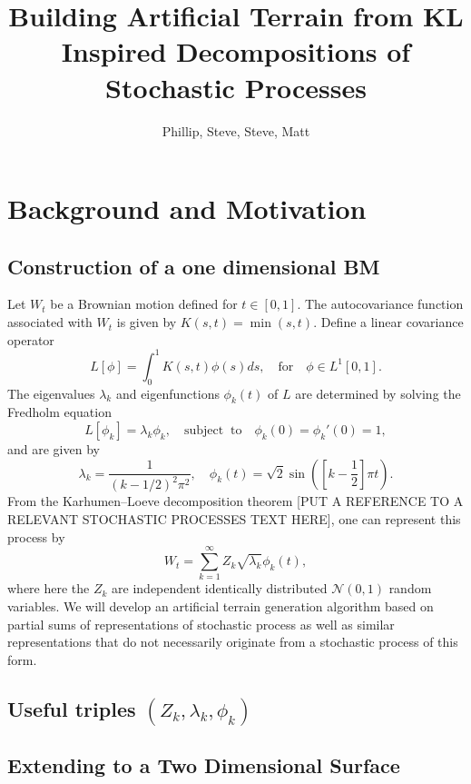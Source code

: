 \documentclass{amsart}
\title{Building Artificial Terrain from KL Inspired Decompositions of Stochastic Processes}
\author{Phillip, Steve, Steve, Matt}
\begin{document}
\maketitle

\section{Background and Motivation}

\subsection{Construction of a one dimensional BM}
Let $W_t$ be a Brownian motion defined for $t\in[0,1]$.  The autocovariance function 
associated with $W_t$ is given by $K(s,t)=\min(s,t)$.  Define a linear covariance operator
%
\begin{equation}
    L[\phi]=\int_0^1K(s,t)\phi(s)ds, \quad\mathrm{for}\quad \phi\in L^1[0,1].
\end{equation}
%
The eigenvalues $\lambda_k$ and eigenfunctions $\phi_k(t)$ of $L$ are determined by solving 
the Fredholm equation
%
\begin{equation}
    L[\phi_k] = \lambda_k\phi_k,\quad\mathrm{subject\;\;to}\quad \phi_k(0)=\phi_k'(0)=1,
\end{equation}
%
and are given by
%
\begin{equation}
    \lambda_k = \frac{1}{(k-1/2)^2\pi^2},\quad 
    \phi_k(t) = \sqrt{2}\sin\left(\left[k-\frac{1}{2}\right]\pi t\right).
\end{equation}
%
From the Karhumen--Loeve decomposition theorem [PUT A REFERENCE TO A RELEVANT 
STOCHASTIC PROCESSES TEXT HERE],
one can represent this process by
%
\begin{equation}
    W_t = \sum_{k=1}^\infty Z_k \sqrt{\lambda_k}\phi_k(t), \label{proc}
\end{equation}
%
where here the $Z_k$ are independent identically distributed $\mathcal{N}(0,1)$ 
random variables. We will develop an artificial terrain generation algorithm based 
on partial sums of representations of stochastic process as well as similar representations
that do not necessarily originate from a stochastic process of this form.

\subsection{Useful triples $(Z_k,\lambda_k,\phi_k)$}

\subsection{Extending to a Two Dimensional Surface}
\end{document}
